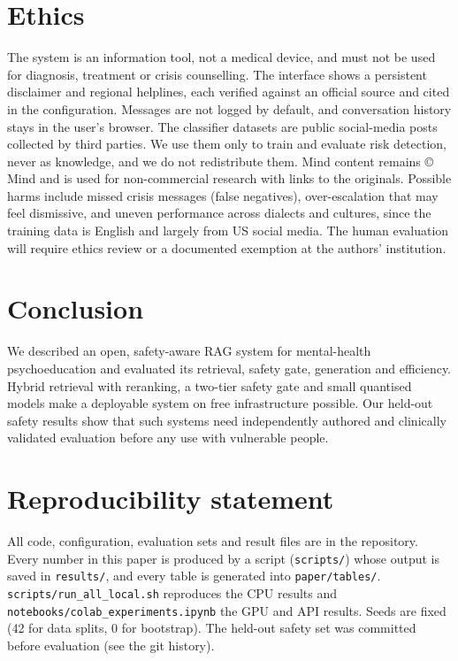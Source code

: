\documentclass[preprint,12pt,authoryear]{elsarticle}
\begin{document}
\section{Ethics}
The system is an information tool, not a medical device, and must not be used for diagnosis, treatment or crisis
counselling. The interface shows a persistent disclaimer and regional helplines, each verified against an official
source and cited in the configuration. Messages are not logged by default, and conversation history stays in the
user's browser. The classifier datasets are public social-media posts collected by third parties. We use them only to
train and evaluate risk detection, never as knowledge, and we do not redistribute them. Mind content remains
\copyright{} Mind and is used for non-commercial research with links to the originals. Possible harms include missed
crisis messages (false negatives), over-escalation that may feel dismissive, and uneven performance across dialects and
cultures, since the training data is English and largely from US social media. The human evaluation will require
ethics review or a documented exemption at the authors' institution.

\section{Conclusion}
We described an open, safety-aware RAG system for mental-health psychoeducation and evaluated its retrieval, safety gate,
generation and efficiency. Hybrid retrieval with reranking, a two-tier safety gate and small quantised models make a
deployable system on free infrastructure possible. Our held-out safety results show that such systems need
independently authored and clinically validated evaluation before any use with vulnerable people.

\section*{Reproducibility statement}
All code, configuration, evaluation sets and result files are in the repository. Every number in this paper is produced
by a script (\texttt{scripts/}) whose output is saved in \texttt{results/}, and every table is generated into
\texttt{paper/tables/}. \texttt{scripts/run\_all\_local.sh} reproduces the CPU results and
\texttt{notebooks/colab\_experiments.ipynb} the GPU and API results. Seeds are fixed (42 for data splits, 0 for
bootstrap). The held-out safety set was committed before evaluation (see the git history).
\end{document}
